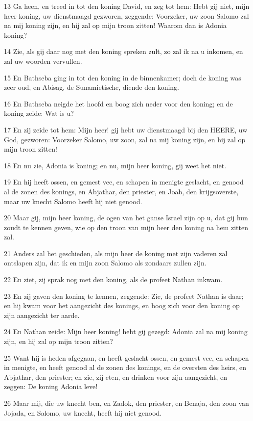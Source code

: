 \par 13 Ga heen, en treed in tot den koning David, en zeg tot hem: Hebt gij niet, mijn heer koning, uw dienstmaagd gezworen, zeggende: Voorzeker, uw zoon Salomo zal na mij koning zijn, en hij zal op mijn troon zitten! Waarom dan is Adonia koning?
\par 14 Zie, als gij daar nog met den koning spreken zult, zo zal ik na u inkomen, en zal uw woorden vervullen.
\par 15 En Bathseba ging in tot den koning in de binnenkamer; doch de koning was zeer oud, en Abisag, de Sunamietische, diende den koning.
\par 16 En Bathseba neigde het hoofd en boog zich neder voor den koning; en de koning zeide: Wat is u?
\par 17 En zij zeide tot hem: Mijn heer! gij hebt uw dienstmaagd bij den HEERE, uw God, gezworen: Voorzeker Salomo, uw zoon, zal na mij koning zijn, en hij zal op mijn troon zitten!
\par 18 En nu zie, Adonia is koning; en nu, mijn heer koning, gij weet het niet.
\par 19 En hij heeft ossen, en gemest vee, en schapen in menigte geslacht, en genood al de zonen des konings, en Abjathar, den priester, en Joab, den krijgsoverste, maar uw knecht Salomo heeft hij niet genood.
\par 20 Maar gij, mijn heer koning, de ogen van het ganse Israel zijn op u, dat gij hun zoudt te kennen geven, wie op den troon van mijn heer den koning na hem zitten zal.
\par 21 Anders zal het geschieden, als mijn heer de koning met zijn vaderen zal ontslapen zijn, dat ik en mijn zoon Salomo als zondaars zullen zijn.
\par 22 En ziet, zij sprak nog met den koning, als de profeet Nathan inkwam.
\par 23 En zij gaven den koning te kennen, zeggende: Zie, de profeet Nathan is daar; en hij kwam voor het aangezicht des konings, en boog zich voor den koning op zijn aangezicht ter aarde.
\par 24 En Nathan zeide: Mijn heer koning! hebt gij gezegd: Adonia zal na mij koning zijn, en hij zal op mijn troon zitten?
\par 25 Want hij is heden afgegaan, en heeft geslacht ossen, en gemest vee, en schapen in menigte, en heeft genood al de zonen des konings, en de oversten des heirs, en Abjathar, den priester; en zie, zij eten, en drinken voor zijn aangezicht, en zeggen: De koning Adonia leve!
\par 26 Maar mij, die uw knecht ben, en Zadok, den priester, en Benaja, den zoon van Jojada, en Salomo, uw knecht, heeft hij niet genood.
